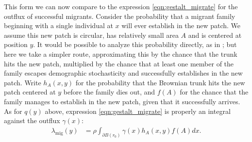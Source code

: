 \documentclass{article}
\newcommand{\citet}[1]{\cite{#1}}
\newcommand{\E}{\mathbb{E}}
\newcommand{\migrate}{\lambda_\text{mig}}
\begin{document}
This form we can now compare to 
the expression \eqref{eqn:gestalt_migrate} for the outflux of successful migrants.
Consider the probability that a migrant family beginning with a single individual at $x$ will ever establish in the new patch.
We assume this new patch is circular, 
has relatively small area $A$ and is centered at position $y$.
It would be possible to analyze this probability directly,
as in \citet{barton1987establishment};
but here we take a simpler route, 
approximating this by the chance that the trunk hits the new patch,
multiplied by the chance that at least one member of the family escapes demographic stochasticity
and successfully establishes in the new patch.
Write $h_A(x,y)$ for the probability that the Brownian trunk
hits the new patch centered at $y$ before the family dies out,
and $f(A)$ for the chance that the family manages to establish in the new patch,
given that it successfully arrives.
As for $q(y)$ above, expression \eqref{eqn:gestalt_migrate} is properly an integral against the outflux $\gamma(x)$:
\begin{align}\label{eqn:migrate_integral}
  \migrate(y) &= \rho \int_{\partial B(r_0)} \gamma(x) h_A(x,y) f(A) dx .
\end{align}
\end{document}
